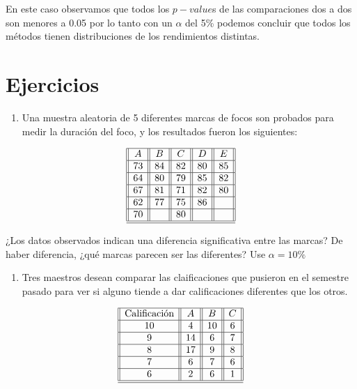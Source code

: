 \documentclass[
  a4paper,
  oneside,
  openany]{book}
\providecommand{\tightlist}{%
  \setlength{\itemsep}{0pt}\setlength{\parskip}{0pt}}
\begin{document}
En este caso observamos que todos los \(p-value\)s de las comparaciones dos a dos son menores a 0.05 por lo tanto con un \(\alpha\) del 5\% podemos concluir que todos los métodos tienen distribuciones de los rendimientos distintas.

\hypertarget{ejercicios-5}{%
\section{Ejercicios}\label{ejercicios-5}}

\begin{enumerate}
\def\labelenumi{\arabic{enumi}.}
\tightlist
\item
  Una muestra aleatoria de 5 diferentes marcas de focos son probados para medir la duración del foco, y los resultados fueron los siguientes:
\end{enumerate}

\[
\begin{array}{||c| |c| |c| |c||c||} 
\hline 
A & B&C&D&E \\ 
 \hline
73&84&82&80&85\\
 \hline
64&80&79&85&82\\
 \hline
67&81&71&82&80\\
 \hline
62&77&75&86&\\
 \hline
70&&80&&\\
\hline
\hline
\end{array}
\]

¿Los datos observados indican una diferencia significativa entre las marcas? De haber diferencia, ¿qué marcas parecen ser las diferentes? Use \(\alpha=10\%\)

\begin{enumerate}
\def\labelenumi{\arabic{enumi}.}
\setcounter{enumi}{1}
\tightlist
\item
  Tres maestros desean comparar las claificaciones que pusieron en el semestre pasado para ver si alguno tiende a dar calificaciones diferentes que los otros.
\end{enumerate}

\[
\begin{array}{||c| |c| |c| |c||} 
\hline 
\mbox{Calificación} & A & B&C \\  
 \hline
10&4&10&6\\
 \hline
9&14&6&7\\
 \hline
8&17&9&8\\
 \hline
7&6&7&6\\
 \hline
6&2&6&1\\
\hline
\hline
\end{array}
\]
\end{document}
